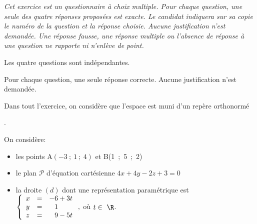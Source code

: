 \emph{Cet exercice est un questionnaire à choix multiple.
Pour chaque question, une seule des quatre réponses proposées est exacte. Le candidat indiquera sur sa copie le numéro de la question et la réponse choisie. Aucune justification n'est demandée. Une réponse fausse, une réponse multiple ou l'absence de réponse à une question ne rapporte ni n'enlève de point.}

Les quatre questions sont indépendantes.
 

Pour chaque question, une seule réponse correcte. Aucune justification n’est demandée.

Dans tout l'exercice, on considère que l'espace est muni d'un repère orthonormé

\Oijk.

On considère:

\begin{itemize}[label=$\bullet~$]
\item les points A$(-3~;~1~;~4)$ et B(1~;~5~;~2)
\item le plan $\mathcal{P}$ d'équation cartésienne $4x + 4y -2z + 3 = 0$
\item la droite $(d)$ dont une représentation paramétrique est $\left\{\begin{array}{l c l}
x&=&- 6 + 3t\\y&=&\phantom{-}1\\z&=&\phantom{-}9 - 5t
\end{array}\right.,$ où $t \in~\R$.
\end{itemize}

